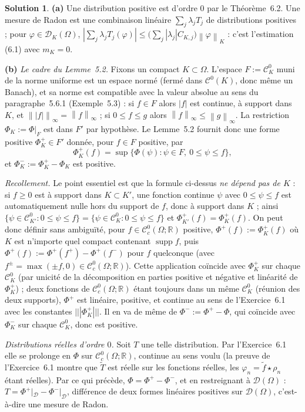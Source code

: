 \documentclass[11pt,a4paper]{article}
\newcommand{\R}{\mathbb{R}}
\newcommand{\norm}[1]{\left\|#1\right\|}
\newcommand{\opnorm}[1]{|\!|\!|#1|\!|\!|}
\newcommand{\Cz}{\mathcal{C}^0}
\newcommand{\Cc}{\mathcal{C}^0_c}
\DeclareMathOperator{\supp}{supp}
\newcommand{\D}{\mathcal{D}}
\theoremstyle{definition}
\newtheorem*{solution}{Solution}
\begin{document}
\begin{solution}
\noindent\textbf{(a)} Une distribution positive est d'ordre $0$ par le Théorème~6.2. Une mesure de Radon est une combinaison linéaire $\sum_j\lambda_jT_j$ de distributions positives ; pour $\varphi\in\D_K(\Omega)$, $|\sum_j\lambda_jT_j(\varphi)|\le\big(\sum_j|\lambda_j|C_{K,j}\big)\norm\varphi_K$ : c'est l'estimation (6.1) avec $m_K=0$.

\medskip
\noindent\textbf{(b)} \emph{Le cadre du Lemme~5.2.} Fixons un compact $K\subset\Omega$. L'espace $F:=\mathcal C^0_K$ muni de la norme uniforme est un espace normé (fermé dans $\Cz(K)$, donc même un Banach), et sa norme est compatible avec la valeur absolue au sens du paragraphe~5.6.1 (Exemple~5.3) : si $f\in F$ alors $|f|$ est continue, à support dans $K$, et $\norm{|f|}_\infty=\norm f_\infty$ ; si $0\le f\le g$ alors $\norm f_\infty\le\norm g_\infty$. La restriction $\Phi_K:=\Phi|_F$ est dans $F'$ par hypothèse. Le Lemme~5.2 fournit donc une forme positive $\Phi_K^+\in F'$ donnée, pour $f\in F$ positive, par
\[
\Phi_K^+(f)=\sup\{\Phi(\psi):\psi\in F,\ 0\le\psi\le f\},
\]
et $\Phi_K^-:=\Phi_K^+-\Phi_K$ est positive.

\emph{Recollement.} Le point essentiel est que la formule ci-dessus \emph{ne dépend pas de $K$} : si $f\ge0$ est à support dans $K\subset K'$, une fonction continue $\psi$ avec $0\le\psi\le f$ est automatiquement nulle hors du support de $f$, donc à support dans $K$ ; ainsi $\{\psi\in\mathcal C^0_{K'}:0\le\psi\le f\}=\{\psi\in\mathcal C^0_K:0\le\psi\le f\}$ et $\Phi_{K'}^+(f)=\Phi_K^+(f)$. On peut donc définir sans ambiguïté, pour $f\in\Cc(\Omega;\R)$ positive, $\Phi^+(f):=\Phi_K^+(f)$ où $K$ est n'importe quel compact contenant $\supp f$, puis $\Phi^+(f):=\Phi^+(f^+)-\Phi^+(f^-)$ pour $f$ quelconque (avec $f^\pm=\max(\pm f,0)\in\Cc(\Omega;\R)$). Cette application coïncide avec $\Phi_K^+$ sur chaque $\mathcal C^0_K$ (par unicité de la décomposition en parties positive et négative et linéarité de $\Phi_K^+$) ; deux fonctions de $\Cc(\Omega;\R)$ étant toujours dans un même $\mathcal C^0_K$ (réunion des deux supports), $\Phi^+$ est linéaire, positive, et continue au sens de l'Exercice~6.1 avec les constantes $\opnorm{\Phi_K^+}$. Il en va de même de $\Phi^-:=\Phi^+-\Phi$, qui coïncide avec $\Phi_K^-$ sur chaque $\mathcal C^0_K$, donc est positive.

\emph{Distributions réelles d'ordre $0$.} Soit $T$ une telle distribution. Par l'Exercice~6.1 elle se prolonge en $\Phi$ sur $\Cc(\Omega;\R)$, continue au sens voulu (la preuve de l'Exercice~6.1 montre que $\tilde T$ est réelle sur les fonctions réelles, les $\varphi_n=\tilde f\star\rho_n$ étant réelles). Par ce qui précède, $\Phi=\Phi^+-\Phi^-$, et en restreignant à $\D(\Omega)$ : $T=\Phi^+|_{\D}-\Phi^-|_{\D}$, différence de deux formes linéaires positives sur $\D(\Omega)$, c'est-à-dire une mesure de Radon.


\end{solution}
\end{document}
